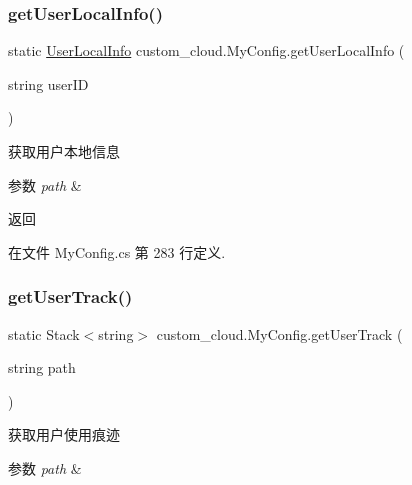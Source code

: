 \subsubsection{\texorpdfstring{get\+User\+Local\+Info()}{getUserLocalInfo()}\hspace{0.1cm}{\footnotesize\ttfamily [2/2]}}
{\footnotesize\ttfamily static \hyperlink{classcustom__cloud_1_1_user_local_info}{User\+Local\+Info} custom\+\_\+cloud.\+My\+Config.\+get\+User\+Local\+Info (\begin{DoxyParamCaption}\item[{string}]{user\+ID }\end{DoxyParamCaption})\hspace{0.3cm}{\ttfamily [static]}}



获取用户本地信息 


\begin{DoxyParams}{参数}
{\em path} & \\
\hline
\end{DoxyParams}
\begin{DoxyReturn}{返回}

\end{DoxyReturn}


在文件 My\+Config.\+cs 第 283 行定义.

\mbox{\label{classcustom__cloud_1_1_my_config_ac7e214c13ef859e4861e7e4b661cdad7}} 
\subsubsection{\texorpdfstring{get\+User\+Track()}{getUserTrack()}\hspace{0.1cm}{\footnotesize\ttfamily [1/2]}}
{\footnotesize\ttfamily static Stack$<$string$>$ custom\+\_\+cloud.\+My\+Config.\+get\+User\+Track (\begin{DoxyParamCaption}\item[{string}]{path }\end{DoxyParamCaption})\hspace{0.3cm}{\ttfamily [static]}}



获取用户使用痕迹 


\begin{DoxyParams}{参数}
{\em path} & \\
\hline
\end{DoxyParams}


